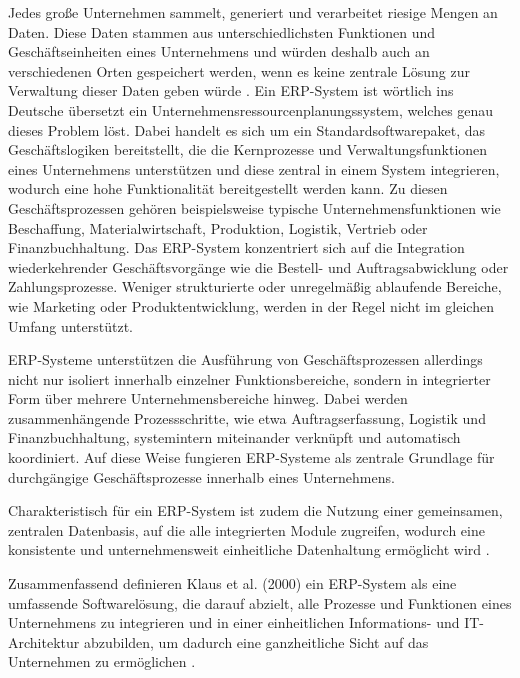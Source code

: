 Jedes große Unternehmen sammelt, generiert und verarbeitet riesige Mengen an Daten. Diese Daten stammen aus unterschiedlichsten Funktionen und Geschäftseinheiten eines Unternehmens und würden deshalb auch an verschiedenen Orten gespeichert werden, wenn es keine zentrale Lösung zur Verwaltung dieser Daten geben würde \cite[]{davenport_putting_1998}. 
Ein \ac{ERP}-System ist wörtlich ins Deutsche übersetzt ein \glqq Unternehmensressourcenplanungssystem\grqq{}, welches genau dieses Problem löst. Dabei handelt es sich um ein Standardsoftwarepaket, das Geschäftslogiken bereitstellt, die die Kernprozesse und Verwaltungsfunktionen eines Unternehmens unterstützen und diese zentral in einem System integrieren, wodurch eine hohe Funktionalität bereitgestellt werden kann. Zu diesen Geschäftsprozessen gehören beispielsweise typische Unternehmensfunktionen wie Beschaffung, Materialwirtschaft, Produktion, Logistik, Vertrieb oder Finanzbuchhaltung. Das \ac{ERP}-System konzentriert sich auf die Integration wiederkehrender Geschäftsvorgänge wie die Bestell- und Auftragsabwicklung oder Zahlungsprozesse. Weniger strukturierte oder unregelmäßig ablaufende Bereiche, wie Marketing oder Produktentwicklung, werden in der Regel nicht im gleichen Umfang unterstützt. \cite[]{klaus_what_2000}

\ac{ERP}-Systeme unterstützen die Ausführung von Geschäftsprozessen allerdings nicht nur isoliert innerhalb einzelner Funktionsbereiche, sondern in integrierter Form über mehrere Unternehmensbereiche hinweg. Dabei werden zusammenhängende Prozessschritte, wie etwa Auftragserfassung, Logistik und Finanzbuchhaltung, systemintern miteinander verknüpft und automatisch koordiniert. Auf diese Weise fungieren \ac{ERP}-Systeme als zentrale Grundlage für durchgängige Geschäftsprozesse innerhalb eines Unternehmens. \cite[\pagef 1ff]{wortmann_evolution_1998}

Charakteristisch für ein \ac{ERP}-System ist zudem die Nutzung einer gemeinsamen, zentralen Datenbasis, auf die alle integrierten Module zugreifen, wodurch eine konsistente und unternehmensweit einheitliche Datenhaltung ermöglicht wird \cite[]{davenport_putting_1998}.

Zusammenfassend definieren Klaus et al. (2000) ein \ac{ERP}-System als eine umfassende Softwarelösung, die darauf abzielt, alle Prozesse und Funktionen eines Unternehmens zu integrieren und in einer einheitlichen Informations- und IT-Architektur abzubilden, um dadurch eine ganzheitliche Sicht auf das Unternehmen zu ermöglichen \cite[\pagef 141f]{klaus_what_2000}.